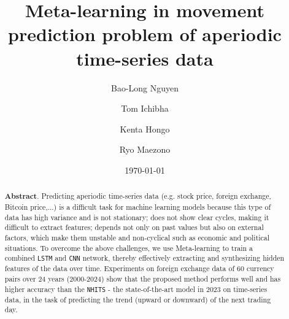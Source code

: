 \documentclass[aps,prb,groupedaddress,twocolumn,showpacs,dvipdfmx,superscriptaddress,pdftex]{revtex4-2}
\begin{document}
\title{
    Meta-learning in movement prediction problem of aperiodic time-series data
}
\author{Bao-Long Nguyen}
%
\author{Tom Ichibha}
%
\author{Kenta Hongo}
%
\author{Ryo Maezono}
%
\date{\today}
\begin{abstract}

    \textbf{Abstract}. Predicting aperiodic time-series data (e.g. stock price, foreign exchange, Bitcoin price,...) is a difficult task for machine learning models because this type of data has high variance and is not stationary; does not show clear cycles, making it difficult to extract features; depends not only on past values but also on external factors, which make them unstable and non-cyclical such as economic and political situations. To overcome the above challenges, we use Meta-learning to train a combined \verb|LSTM| and \verb|CNN| network, thereby effectively extracting and synthesizing hidden features of the data over time. Experiments on foreign exchange data of 60 currency pairs over 24 years (2000-2024) show that the proposed method performs well and has higher accuracy than the \verb|NHITS| - the state-of-the-art model in 2023 on time-series data, in the task of predicting the trend (upward or downward) of the next trading day.

\end{abstract}
\maketitle
\end{document}
